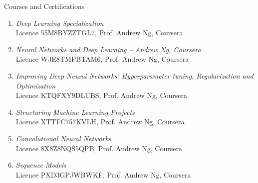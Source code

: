 \begin{rSection}{Courses and Certifications}
    \begin{enumerate}[leftmargin=0.45cm, itemsep=0em, topsep=0.5em, parsep=0.2em]
        \item \emph{Deep Learning Specialization}\\
        Licence 55M8BYZZTGL7, Prof. Andrew Ng, Coursera
        \item \emph{Neural Networks and Deep Learning – Andrew Ng, Coursera}\\
        Licence WJE8TMPBTAM6, Prof. Andrew Ng, Coursera
        \item \emph{Improving Deep Neural Networks: Hyperparameter tuning, Regularization and Optimization} \\
        Licence KTQFXY9DLUBS, Prof. Andrew Ng, Coursera
        \item \emph{Structuring Machine Learning Projects} \\
        Licence XTTFC757KVLH, Prof. Andrew Ng, Coursera
        \item \emph{Convolutional Neural Networks}\\
        Licence 8X8Z8NQS5QPB, Prof. Andrew Ng, Coursera
        \item \emph{Sequence Models}\\
        Licence PXD3GPJWBWKF, Prof. Andrew Ng, Coursera

    \end{enumerate}
\end{rSection}